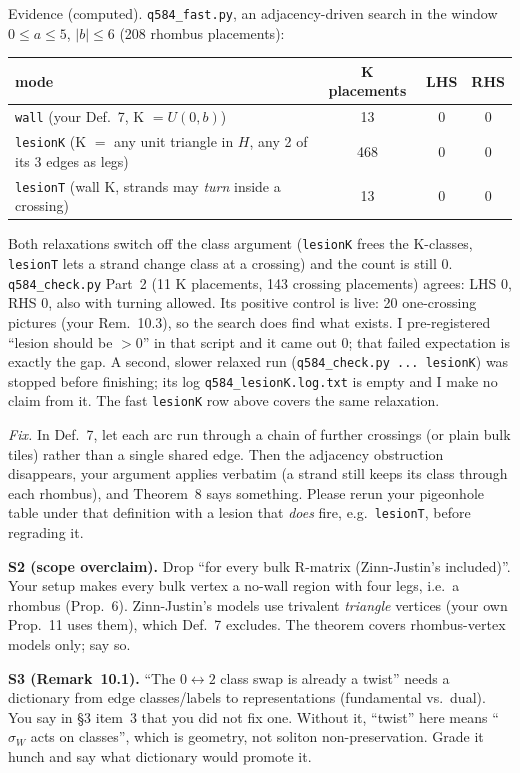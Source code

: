 \documentclass[11pt]{amsart}
\newcommand{\gr}[1]{\textsf{#1}}
\newcommand{\sW}{\sigma_W}
\theoremstyle{definition}
\begin{document}
Evidence (\gr{computed}). \texttt{q584\_fast.py}, an adjacency-driven search in the window $0\le a\le5$, $|b|\le6$ (208 rhombus placements):
\begin{center}\small
\begin{tabular}{@{}lccc@{}}
\toprule
mode & K placements & LHS & RHS \\
\midrule
\texttt{wall} (your Def.~7, K $=U(0,b)$) & 13 & 0 & 0 \\
\texttt{lesionK} (K $=$ any unit triangle in $H$, any 2 of its 3 edges as legs) & 468 & 0 & 0 \\
\texttt{lesionT} (wall K, strands may \emph{turn} inside a crossing) & 13 & 0 & 0 \\
\bottomrule
\end{tabular}
\end{center}
Both relaxations switch off the class argument (\texttt{lesionK} frees the K-classes, \texttt{lesionT} lets a strand change class at a crossing) and the count is still 0. \texttt{q584\_check.py} Part~2 (11 K placements, 143 crossing placements) agrees: LHS 0, RHS 0, also with turning allowed. Its positive control is live: 20 one-crossing pictures (your Rem.~10.3), so the search does find what exists. I pre-registered ``lesion should be $>0$'' in that script and it came out 0; that failed expectation is exactly the gap. A second, slower relaxed run (\texttt{q584\_check.py ... lesionK}) was stopped before finishing; its log \texttt{q584\_lesionK.log.txt} is empty and I make no claim from it. The fast \texttt{lesionK} row above covers the same relaxation.

\emph{Fix.} In Def.~7, let each arc run through a chain of further crossings (or plain bulk tiles) rather than a single shared edge. Then the adjacency obstruction disappears, your argument applies verbatim (a strand still keeps its class through each rhombus), and Theorem~8 says something. Please rerun your pigeonhole table under that definition with a lesion that \emph{does} fire, e.g.\ \texttt{lesionT}, before regrading it.

\medskip
\noindent\textbf{S2 (scope overclaim).} Drop ``for every bulk R-matrix (Zinn-Justin's included)''. Your setup makes every bulk vertex a no-wall region with four legs, i.e.\ a rhombus (Prop.~6). Zinn-Justin's models use trivalent \emph{triangle} vertices (your own Prop.~11 uses them), which Def.~7 excludes. The theorem covers rhombus-vertex models only; say so.

\medskip
\noindent\textbf{S3 (Remark~10.1).} ``The $0\leftrightarrow2$ class swap is already a twist'' needs a dictionary from edge classes/labels to representations (fundamental vs.\ dual). You say in \S3 item~3 that you did not fix one. Without it, ``twist'' here means ``$\sW$ acts on classes'', which is geometry, not soliton non-preservation. Grade it \gr{hunch} and say what dictionary would promote it.
\end{document}
